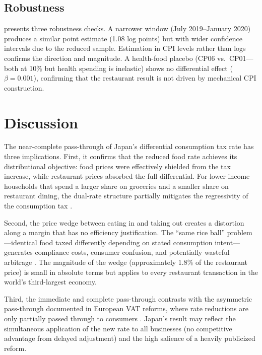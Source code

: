 \documentclass[12pt]{article}
\begin{document}


\subsection{Robustness}

 presents three robustness checks. A narrower window (July 2019--January 2020) produces a similar point estimate (1.08 log points) but with wider confidence intervals due to the reduced sample. Estimation in CPI levels rather than logs confirms the direction and magnitude. A health-food placebo (CP06 vs.\ CP01---both at 10\% but health spending is inelastic) shows no differential effect ($\beta = 0.001$), confirming that the restaurant result is not driven by mechanical CPI construction.



\section{Discussion}

The near-complete pass-through of Japan's differential consumption tax rate has three implications. First, it confirms that the reduced food rate achieves its distributional objective: food prices were effectively shielded from the tax increase, while restaurant prices absorbed the full differential. For lower-income households that spend a larger share on groceries and a smaller share on restaurant dining, the dual-rate structure partially mitigates the regressivity of the consumption tax \citep{crossley2009anatomy}.

Second, the price wedge between eating in and taking out creates a distortion along a margin that has no efficiency justification. The ``same rice ball'' problem---identical food taxed differently depending on stated consumption intent---generates compliance costs, consumer confusion, and potentially wasteful arbitrage \citep{cnossen2020value}. The magnitude of the wedge (approximately 1.8\% of the restaurant price) is small in absolute terms but applies to every restaurant transaction in the world's third-largest economy.

Third, the immediate and complete pass-through contrasts with the asymmetric pass-through documented in European VAT reforms, where rate reductions are only partially passed through to consumers \citep{benzarti2019really}. Japan's result may reflect the simultaneous application of the new rate to all businesses (no competitive advantage from delayed adjustment) and the high salience of a heavily publicized reform.
\end{document}
